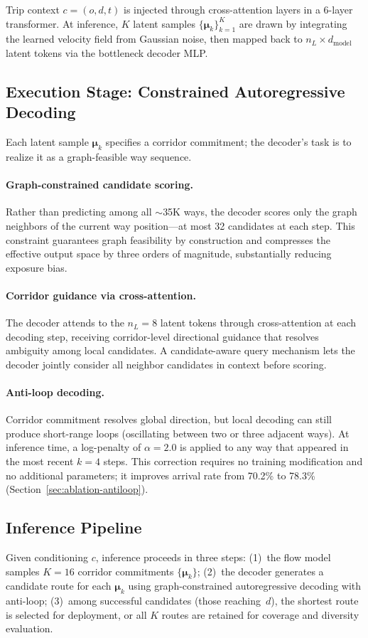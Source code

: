 Trip context $c = (o, d, t)$ is injected through cross-attention layers in a 6-layer transformer.
At inference, $K$ latent samples $\{\boldsymbol{\mu}_k\}_{k=1}^K$ are drawn by integrating the learned velocity field from Gaussian noise, then mapped back to $n_L \times d_{\mathrm{model}}$ latent tokens via the bottleneck decoder MLP.

\subsection{Execution Stage: Constrained Autoregressive Decoding}
\label{sec:decoder}

Each latent sample $\boldsymbol{\mu}_k$ specifies a corridor commitment; the decoder's task is to realize it as a graph-feasible way sequence.

\paragraph{Graph-constrained candidate scoring.}
Rather than predicting among all $\sim$35K ways, the decoder scores only the graph neighbors of the current way position---at most 32 candidates at each step.
This constraint guarantees graph feasibility by construction and compresses the effective output space by three orders of magnitude, substantially reducing exposure bias.

\paragraph{Corridor guidance via cross-attention.}
The decoder attends to the $n_L\!=\!8$ latent tokens through cross-attention at each decoding step, receiving corridor-level directional guidance that resolves ambiguity among local candidates.
A candidate-aware query mechanism lets the decoder jointly consider all neighbor candidates in context before scoring.

\paragraph{Anti-loop decoding.}
Corridor commitment resolves global direction, but local decoding can still produce short-range loops (oscillating between two or three adjacent ways).
At inference time, a log-penalty of $\alpha\!=\!2.0$ is applied to any way that appeared in the most recent $k\!=\!4$ steps.
This correction requires no training modification and no additional parameters; it improves arrival rate from 70.2\% to 78.3\% (Section~\ref{sec:ablation-antiloop}).

\subsection{Inference Pipeline}
\label{sec:inference}

Given conditioning $c$, inference proceeds in three steps:
(1)~the flow model samples $K\!=\!16$ corridor commitments $\{\boldsymbol{\mu}_k\}$;
(2)~the decoder generates a candidate route for each $\boldsymbol{\mu}_k$ using graph-constrained autoregressive decoding with anti-loop;
(3)~among successful candidates (those reaching~$d$), the shortest route is selected for deployment, or all $K$ routes are retained for coverage and diversity evaluation.
